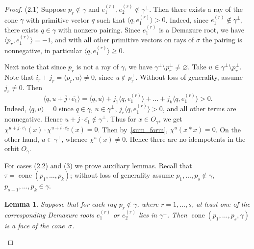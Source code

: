 \documentclass[a4paper, 11pt]{amsart}
\theoremstyle{plain}
\newtheorem{lemma}[theorem]{Lemma}
\theoremstyle{remark}
\theoremstyle{definition}
\newcommand{\ol}[1]{\overline{#1}}
\DeclareMathOperator{\cone}{cone}
\begin{document}
\begin{proof}
	\medskip
	
	(2.1) Suppose $p_r \notin \gamma$ and $e_1^{(r)}, e_2^{(r)} \notin \gamma^\perp$. Then there exists a ray of the cone $\gamma$ with primitive vector $q$ such that $\langle q, e_1^{(r)} \rangle > 0$. Indeed, since $e_1^{(r)}\notin \gamma^\perp$, there exists $q \in \gamma$ with nonzero pairing. Since $e_1^{(r)}$ is a Demazure root, we have $\langle p_r, e_1^{(r)} \rangle = -1$, and with all other primitive vectors on rays of $\sigma$ the pairing is nonnegative, in particular $\langle q, e_1^{(r)} \rangle \geq 0$.  

	Next note that since $p_r$ is not a ray of $\gamma$, we have $\gamma^\perp \setminus p_r^\perp \neq \varnothing$. Take $u \in \gamma^\perp \setminus p_r^\perp$. Note that $i_r + j_r = \langle p_r, u \rangle \neq 0$, since $u \notin p_r^\perp$. Without loss of generality, assume $j_r \neq 0$. Then \[\langle q, u + \ol{j} \cdot \ol{e_1} \rangle = \langle q, u \rangle + j_1 \langle q, e_1^{(r)} \rangle + \ldots + j_k\langle q, e_1^{(r)} \rangle > 0.\] Indeed, $\langle q, u \rangle = 0$ since $q \in \gamma$, $u \in \gamma^\perp$, $j_r \langle q, e_1^{(r)} \rangle > 0$, and all other terms are nonnegative. Hence $u + \ol{j} \cdot \ol{e_1} \notin \gamma^\perp$. Thus for $x \in O_\gamma$, we get $\chi^{u + \ol{j} \cdot \ol{e_1}}(x)\cdot \chi^{u + \ol{i} \cdot \ol{e_2}}(x) = 0$. Then by~\eqref{sum_form}, $\chi^u(x*x) = 0$. On the other hand, $u \in \gamma^\perp$, whence $\chi^u(x) \neq 0$. Hence there are no idempotents in the orbit $O_\gamma$. 
	
	\bigskip
	
	For cases (2.2) and (3) we prove auxiliary lemmas. Recall that $\tau = \cone(p_1, \ldots, p_k)$; without loss of generality assume ${p_1, \ldots, p_s \notin \gamma}$, ${p_{s+1}, \ldots, p_k \in \gamma}$. 
	
	\begin{lemma}\label{lm:cone}
		Suppose that for each ray $p_r \notin \gamma$, where $r = 1, \ldots, s$, at least one of the corresponding Demazure roots $e_1^{(r)}$ or $e_2^{(r)}$ lies in $\gamma^\perp$. Then $\cone(p_1, \ldots, p_s, \gamma)$ is a face of the cone~$\sigma$.
	\end{lemma}
	

\end{proof}
\end{document}
